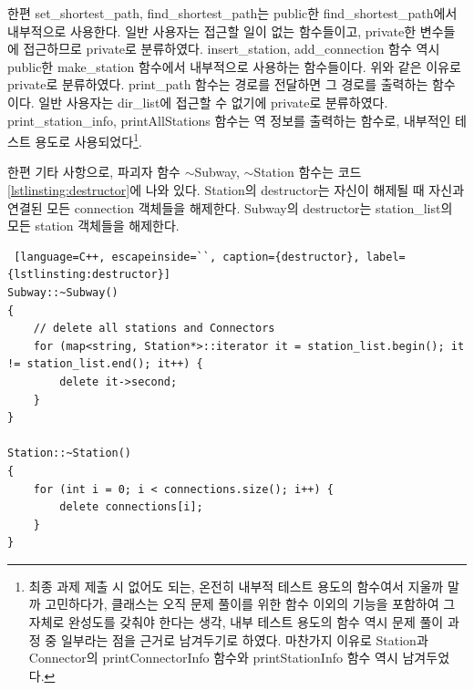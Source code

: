 \documentclass{article}
\begin{document}
한편 set\_shortest\_path, find\_shortest\_path는 public한 find\_shortest\_path에서 내부적으로 사용한다. 일반 사용자는 접근할 일이 없는 함수들이고, private한 변수들에 접근하므로 private로 분류하였다. insert\_station, add\_connection 함수 역시 public한 make\_station 함수에서 내부적으로 사용하는 함수들이다. 위와 같은 이유로 private로 분류하였다. print\_path 함수는 경로를 전달하면 그 경로를 출력하는 함수이다. 일반 사용자는 dir\_list에 접근할 수 없기에 private로 분류하였다. print\_station\_info, printAllStations 함수는 역 정보를 출력하는 함수로, 내부적인 테스트 용도로 사용되었다\footnote{최종 과제 제출 시 없어도 되는, 온전히 내부적 테스트 용도의 함수여서 지울까 말까 고민하다가, 클래스는 오직 문제 풀이를 위한 함수 이외의 기능을 포함하여 그 자체로 완성도를 갖춰야 한다는 생각, 내부 테스트 용도의 함수 역시 문제 풀이 과정 중 일부라는 점을 근거로 남겨두기로 하였다. 마찬가지 이유로 Station과 Connector의 printConnectorInfo 함수와 printStationInfo 함수 역시 남겨두었다.}.

한편 기타 사항으로, 파괴자 함수 $\sim$Subway, $\sim$Station 함수는 코드 \ref{lstlinsting:destructor}에 나와 있다. Station의 destructor는 자신이 해제될 때 자신과 연결된 모든 connection 객체들을 해제한다. Subway의 destructor는 station\_list의 모든 station 객체들을 해제한다.
\begin{lstlisting} [language=C++, escapeinside=``, caption={destructor}, label={lstlinsting:destructor}]
Subway::~Subway()
{
	// delete all stations and Connectors
	for (map<string, Station*>::iterator it = station_list.begin(); it != station_list.end(); it++) {
		delete it->second;
	}
}

Station::~Station()
{
	for (int i = 0; i < connections.size(); i++) {
		delete connections[i];
	}
}
\end{lstlisting}
\end{document}
